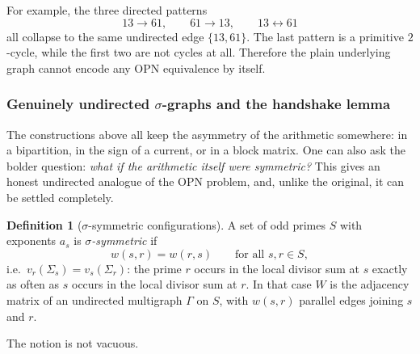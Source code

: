 \documentclass[11pt]{article}
\theoremstyle{definition}
\newtheorem{definition}[theorem]{Definition}
\theoremstyle{remark}
\begin{document}
For example, the three directed patterns
\[
13\to61,\qquad 61\to13,\qquad 13\leftrightarrow61
\]
all collapse to the same undirected edge $\{13,61\}$.  The last pattern is a
primitive $2$-cycle, while the first two are not cycles at all.  Therefore the
plain underlying graph cannot encode any OPN equivalence by itself.

\subsubsection{Genuinely undirected $\sigma$-graphs and the handshake lemma}
\label{subsec:symmetric}

The constructions above all keep the asymmetry of the arithmetic somewhere:
in a bipartition, in the sign of a current, or in a block matrix.  One can
also ask the bolder question: \emph{what if the arithmetic itself were
symmetric?}  This gives an honest undirected analogue of the OPN problem, and,
unlike the original, it can be settled completely.

\begin{definition}[$\sigma$-symmetric configurations]
A set of odd primes $S$ with exponents $a_s$ is \emph{$\sigma$-symmetric} if
\[
w(s,r)=w(r,s)\qquad\text{for all }s,r\in S,
\]
i.e.\ $v_r(\Sigma_s)=v_s(\Sigma_r)$: the prime $r$ occurs in the local
divisor sum at $s$ exactly as often as $s$ occurs in the local divisor sum at
$r$.  In that case $W$ is the adjacency matrix of an undirected multigraph
$\Gamma$ on $S$, with $w(s,r)$ parallel edges joining $s$ and $r$.
\end{definition}

The notion is not vacuous.
\end{document}
